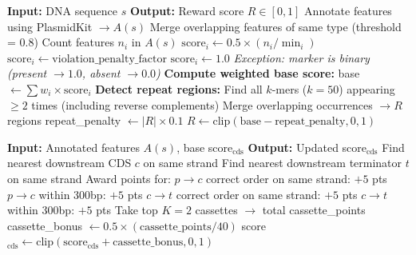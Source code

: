\documentclass{article}
\theoremstyle{plain}
\theoremstyle{definition}
\theoremstyle{remark}
\begin{document}
\begin{algorithm}[h]
\caption{Plasmid Reward Scoring}
\begin{algorithmic}[1]
\STATE \textbf{Input:} DNA sequence $s$
\STATE \textbf{Output:} Reward score $R \in [0,1]$
\STATE
\STATE Annotate features using PlasmidKit $\rightarrow A(s)$
\STATE Merge overlapping features of same type (threshold = 0.8)
\STATE
{}
\STATE Count features $n_i$ in $A(s)$
\STATE $\text{score}_i \leftarrow 0.5 \times (n_i / \min_i)$
\STATE $\text{score}_i \leftarrow \text{violation\_penalty\_factor}$ 
\ELSE
\STATE $\text{score}_i \leftarrow 1.0$
\ENDIF
\STATE \textit{Exception: marker is binary (present $\rightarrow 1.0$, absent $\rightarrow 0.0$)}
\ENDFOR
\STATE
\STATE \textbf{Compute weighted base score:}
\STATE base $\leftarrow \sum w_i \times \text{score}_i$
\STATE
\STATE \textbf{Detect repeat regions:}
\STATE Find all $k$-mers ($k=50$) appearing $\geq 2$ times (including reverse complements)
\STATE Merge overlapping occurrences $\rightarrow R$ regions
\STATE repeat\_penalty $\leftarrow |R| \times 0.1$
\STATE
\RETURN $R \leftarrow \text{clip}(\text{base} - \text{repeat\_penalty}, 0, 1)$
\end{algorithmic}
\end{algorithm}

\begin{algorithm}[h]
\caption{CDS Cassette Bonus Subroutine}
\begin{algorithmic}[1]
\STATE \textbf{Input:} Annotated features $A(s)$, base score$_{\text{cds}}$
\STATE \textbf{Output:} Updated score$_{\text{cds}}$
\STATE
{}
\STATE Find nearest downstream CDS $c$ on same strand
\STATE Find nearest downstream terminator $t$ on same strand
\STATE Award points for:
\STATE \hspace{0.5cm} $p \rightarrow c$ correct order on same strand: $+5$ pts
\STATE \hspace{0.5cm} $p \rightarrow c$ within 300bp: $+5$ pts
\STATE \hspace{0.5cm} $c \rightarrow t$ correct order on same strand: $+5$ pts
\STATE \hspace{0.5cm} $c \rightarrow t$ within 300bp: $+5$ pts
\ENDFOR
\STATE Take top $K=2$ cassettes $\rightarrow$ total cassette\_points
\STATE cassette\_bonus $\leftarrow 0.5 \times (\text{cassette\_points} / 40)$
\RETURN score$_{\text{cds}} \leftarrow \text{clip}(\text{score}_{\text{cds}} + \text{cassette\_bonus}, 0, 1)$
\end{algorithmic}
\end{algorithm}
\end{document}
